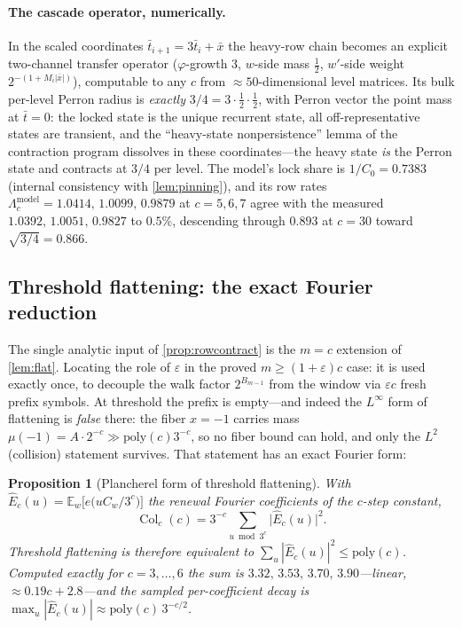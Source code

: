 \documentclass[11pt]{article}
\newcommand{\E}{\mathbb{E}}
\theoremstyle{plain}
\newtheorem{proposition}{Proposition}
\theoremstyle{definition}
\theoremstyle{remark}
\begin{document}
\paragraph{The cascade operator, numerically.} In the scaled coordinates
$\bar t_{i+1}=3\bar t_i+\bar x$ the heavy-row chain becomes an explicit
two-channel transfer operator ($\varphi$-growth $3$, $w$-side mass
$\tfrac12$, $w'$-side weight $2^{-(1+M_i|\bar x|)}$), computable to any $c$
from $\approx50$-dimensional level matrices. Its bulk per-level Perron
radius is \emph{exactly} $3/4=3\cdot\tfrac12\cdot\tfrac12$, with Perron
vector the point mass at $\bar t=0$: the locked state is the unique
recurrent state, all off-representative states are transient, and the
``heavy-state nonpersistence'' lemma of the contraction program dissolves
in these coordinates---the heavy state \emph{is} the Perron state and
contracts at $3/4$ per level. The model's lock share is $1/C_0=0.7383$
(internal consistency with \cref{lem:pinning}), and its row rates
$\Lambda^{\mathrm{model}}_c=1.0414,\,1.0099,\,0.9879$ at $c=5,6,7$ agree
with the measured $1.0392,\,1.0051,\,0.9827$ to $0.5\%$, descending through
$0.893$ at $c=30$ toward $\sqrt{3/4}=0.866$.

\subsection*{Threshold flattening: the exact Fourier reduction}

The single analytic input of \cref{prop:rowcontract} is the $m=c$ extension
of \cref{lem:flat}. Locating the role of $\varepsilon$ in the proved
$m\ge(1+\varepsilon)c$ case: it is used exactly once, to decouple the walk
factor $2^{B_{m-1}}$ from the window via $\varepsilon c$ fresh prefix
symbols. At threshold the prefix is empty---and indeed the $L^\infty$ form
of flattening is \emph{false} there: the fiber $x=-1$ carries mass
$\mu(-1)=A\cdot2^{-c}\gg\mathrm{poly}(c)3^{-c}$, so no fiber bound can
hold, and only the $L^2$ (collision) statement survives. That statement
has an exact Fourier form:

\begin{proposition}[Plancherel form of threshold flattening]\label{prop:plancherel}
With $\hat E_c(u)=\E_w\bigl[e\bigl(uC_w/3^c\bigr)\bigr]$ the renewal
Fourier coefficients of the $c$-step constant,
\[
\operatorname{Col}_c(c)=3^{-c}\sum_{u\bmod 3^c}\bigl|\hat E_c(u)\bigr|^2 .
\]
Threshold flattening is therefore \emph{equivalent} to
$\sum_u|\hat E_c(u)|^2\le\mathrm{poly}(c)$. Computed exactly for
$c=3,\dots,6$ the sum is $3.32,\,3.53,\,3.70,\,3.90$---\emph{linear},
$\approx0.19c+2.8$---and the sampled per-coefficient decay is
$\max_u|\hat E_c(u)|\approx\mathrm{poly}(c)\,3^{-c/2}$.
\end{proposition}
\end{document}
